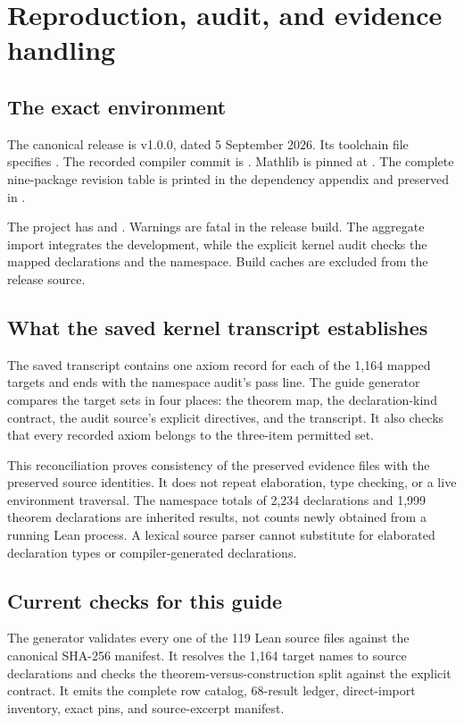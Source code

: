 \section{Reproduction, audit, and evidence handling}
\subsection{The exact environment}
The canonical release is v1.0.0, dated 5 September 2026. Its toolchain file specifies . The recorded compiler commit is . Mathlib is pinned at . The complete nine-package revision table is printed in the dependency appendix and preserved in .

The project has  and . Warnings are fatal in the release build. The aggregate import integrates the development, while the explicit kernel audit checks the mapped declarations and the namespace. Build caches are excluded from the release source.

\subsection{What the saved kernel transcript establishes}
The saved transcript contains one axiom record for each of the 1,164 mapped targets and ends with the namespace audit's pass line. The guide generator compares the target sets in four places: the theorem map, the declaration-kind contract, the audit source's explicit directives, and the transcript. It also checks that every recorded axiom belongs to the three-item permitted set.

This reconciliation proves consistency of the preserved evidence files with the preserved source identities. It does not repeat elaboration, type checking, or a live environment traversal. The namespace totals of 2,234 declarations and 1,999 theorem declarations are inherited results, not counts newly obtained from a running Lean process. A lexical source parser cannot substitute for elaborated declaration types or compiler-generated declarations.

\subsection{Current checks for this guide}
The generator validates every one of the 119 Lean source files against the canonical SHA-256 manifest. It resolves the 1,164 target names to source declarations and checks the theorem-versus-construction split against the explicit contract. It emits the complete row catalog, 68-result ledger, direct-import inventory, exact pins, and source-excerpt manifest.

